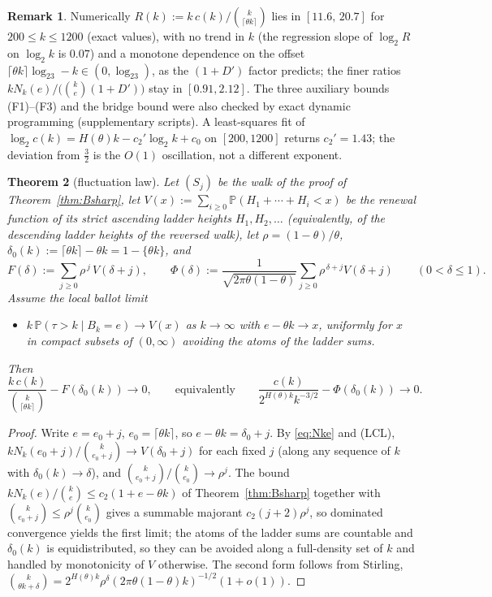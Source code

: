 \documentclass[11pt]{article}
\newtheorem{theorem}{Theorem}[section]
\theoremstyle{definition}
\newtheorem{remark}[theorem]{Remark}
\newcommand{\Prob}{\mathbb{P}}
\newcommand{\ceil}[1]{\lceil #1\rceil}
\begin{document}
\begin{remark}\label{rem:Bsharpnum}
Numerically $R(k):=k\,c(k)/\binom{k}{\ceil{\theta k}}$ lies in
$[11.6,\,20.7]$ for $200\le k\le1200$ (exact values), with no trend in
$k$ (the regression slope of $\log_2R$ on $\log_2k$ is $0.07$) and a
monotone dependence on the offset $\ceil{\theta k}\log_23-k\in(0,\log_23)$,
as the $(1+D')$ factor predicts; the finer ratios
$kN_k(e)/\bigl(\binom ke(1+D')\bigr)$ stay in $[0.91,2.12]$. The three
auxiliary bounds (F1)--(F3) and the bridge bound were also checked by
exact dynamic programming (supplementary scripts). A least-squares fit of
$\log_2c(k)=H(\theta)k-c_2'\log_2k+c_0$ on $[200,1200]$ returns
$c_2'=1.43$; the deviation from $\tfrac32$ is the $O(1)$ oscillation,
not a different exponent.
\end{remark}

\begin{theorem}[fluctuation law]\label{thm:fluct}
Let $(S_j)$ be the walk of the proof of Theorem~\ref{thm:Bsharp}, let
$V(x):=\sum_{i\ge0}\Prob(H_1+\cdots+H_i<x)$ be the renewal function of
its strict ascending ladder heights $H_1,H_2,\ldots$ (equivalently, of the
descending ladder heights of the reversed walk), let
$\rho=(1-\theta)/\theta$, $\delta_0(k):=\ceil{\theta k}-\theta k=1-\{\theta k\}$,
and
\[
F(\delta):=\sum_{j\ge0}\rho^{\,j}\,V(\delta+j),\qquad
\Phi(\delta):=\frac{1}{\sqrt{2\pi\theta(1-\theta)}}\sum_{j\ge0}\rho^{\,\delta+j}V(\delta+j)
\qquad(0<\delta\le 1).
\]
Assume the local ballot limit
\begin{itemize}
\item[(LCL)] $k\,\Prob(\tau>k\mid B_k=e)\to V(x)$ as $k\to\infty$ with
  $e-\theta k\to x$, uniformly for $x$ in compact subsets of $(0,\infty)$
  avoiding the atoms of the ladder sums.
\end{itemize}
Then
\[
\frac{k\,c(k)}{\binom{k}{\ceil{\theta k}}}-F(\delta_0(k))\to 0,
\qquad\text{equivalently}\qquad
\frac{c(k)}{2^{H(\theta)k}k^{-3/2}}-\Phi(\delta_0(k))\to 0 .
\]
\end{theorem}

\begin{proof}
Write $e=e_0+j$, $e_0=\ceil{\theta k}$, so $e-\theta k=\delta_0+j$. By
\eqref{eq:Nke} and (LCL), $kN_k(e_0+j)/\binom{k}{e_0+j}\to V(\delta_0+j)$
for each fixed $j$ (along any sequence of $k$ with $\delta_0(k)\to\delta$),
and $\binom{k}{e_0+j}/\binom{k}{e_0}\to\rho^j$. The bound
$kN_k(e)/\binom ke\le c_2(1+e-\theta k)$ of Theorem~\ref{thm:Bsharp}
together with $\binom{k}{e_0+j}\le\rho^j\binom{k}{e_0}$ gives a summable
majorant $c_2(j+2)\rho^j$, so dominated convergence yields the first
limit; the atoms of the ladder sums are countable and $\delta_0(k)$ is
equidistributed, so they can be avoided along a full-density set of $k$
and handled by monotonicity of $V$ otherwise. The second form follows
from Stirling, $\binom{k}{\theta k+\delta}=2^{H(\theta)k}\rho^{\delta}
(2\pi\theta(1-\theta)k)^{-1/2}(1+o(1))$.
\end{proof}
\end{document}
